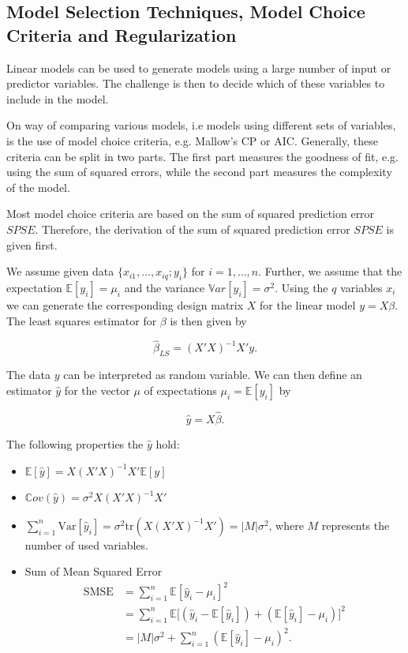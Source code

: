 \documentclass[10pt,a4paper]{article}
\begin{document}
\subsection{Model Selection Techniques, Model Choice Criteria and Regularization}

Linear models can be used to generate models using a large number of input or predictor variables. The challenge is then to decide which of these variables to include in the model. 

On way of comparing various models, i.e models using different sets of variables, is the use of model choice criteria, e.g. Mallow's CP or AIC. Generally, these criteria can be split in two parts. The first part measures the goodness of fit, e.g. using the sum of squared errors, while the second part measures the complexity of the model. 

Most model choice criteria are based on the sum of squared prediction error $SPSE$. Therefore, the derivation of the sum of squared prediction error $SPSE$ is given first.

We assume given data $\{ x_{i1}, \dots, x_{iq}; y_i\}$ for $i =1, \dots, n$. Further, we assume that the expectation $\mathbb{E}[y_i] = \mu_i$ and the variance $\mathbb{V}ar[y_i] = \sigma^2$. Using the $q$ variables $x_i$ we can generate the corresponding design matrix $X$ for the linear model $y = X\beta$. The least squares estimator for $\beta$ is then given by

$$\hat \beta_{LS} = (X'X)^{-1}X'y.$$

The data $y$ can be interpreted as random variable. We can then define an estimator $\hat  y$ for the vector $\mu$ of expectations $\mu_i = \mathbb{E}[y_i]$ by

$$\hat  y = X \hat \beta.$$

The following properties the $\hat y$ hold:

\begin{itemize}
	\item $\mathbb{E} [\hat y] = X(X'X)^{-1}X'\mathbb{E}[y]$
	\item $\mathbb Cov(\hat y) = \sigma^2 X(X'X)^{-1}X'$
	\item $\sum_{i=1}^n \text{Var} [\hat y_i] = \sigma^2 \text{tr}(X(X'X)^{-1}X') = \vert M \vert \sigma^2$, where $M$ represents the number  of used variables.
	\item Sum of Mean Squared Error
		\begin{equation}  
		\begin{split} 
		\text{SMSE} &= \sum_{i=1}^n \mathbb{E}[\hat y_i - \mu_i]^2 \\
				    &= \sum_{i=1}^n \mathbb{E}\big[(\hat y_i - \mathbb{E}[\hat y_i]) + (\mathbb{E}[\hat y_i] - \mu_i) \big]^2 \\
				    &= \vert M \vert\sigma^2 + \sum_{i=1}^n(\mathbb{E}[\hat y_i] - \mu_i)^2.
		\end{split}
		\end{equation}
\end{itemize}
\end{document}
